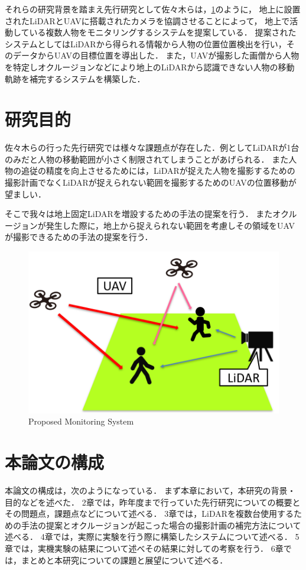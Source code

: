 \documentclass[autodetect-engine,dvipdfmx-if-dvi,ja=standard,a4j,jbase=11pt,magstyle=nomag*]{bxjsreport}
\begin{document}
それらの研究背景を踏まえ先行研究として佐々木らは，\cref{fig:proposed_system}のように，
地上に設置されたLiDARとUAVに搭載されたカメラを協調させることによって，
地上で活動している複数人物をモニタリングするシステムを提案している\cite{sasaki_2019}．
提案されたシステムとしてはLiDARから得られる情報から人物の位置位置検出を行い，そのデータからUAVの目標位置を導出した．
また，UAVが撮影した画僧から人物を特定しオクルージョンなどにより地上のLiDARから認識できない人物の移動軌跡を補完するシステムを構築した．

\section{研究目的}
佐々木らの行った先行研究では様々な課題点が存在した．例としてLiDARが1台のみだと人物の移動範囲が小さく制限されてしまうことがあげられる．
また人物の追従の精度を向上させるためには，LiDARが捉えた人物を撮影するための撮影計画でなくLiDARが捉えられない範囲を撮影するためのUAVの位置移動が望ましい．

そこで我々は地上固定LiDARを増設するための手法の提案を行う．
またオクルージョンが発生した際に，地上から捉えられない範囲を考慮しその領域をUAVが撮影できるための手法の提案を行う．
\begin{figure}[t]
    \centering
    \includegraphics[width=0.7\linewidth, clip]{./figure/chapter1/propose.png}
    \caption{Proposed Monitoring System}
    \label{fig:proposed_system}
\end{figure}


\section{本論文の構成}
本論文の構成は，次のようになっている．
まず本章において，本研究の背景・目的などを述べた．
2章では，昨年度まで行っていた先行研究についての概要とその問題点，課題点などについて述べる．
3章では，LiDARを複数台使用するための手法の提案とオクルージョンが起こった場合の撮影計画の補完方法について述べる．
4章では，実際に実験を行う際に構築したシステムについて述べる．
5章では，実機実験の結果について述べその結果に対しての考察を行う．
6章では，まとめと本研究についての課題と展望について述べる．
\end{document}
